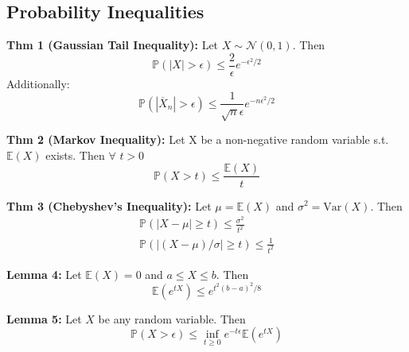 \documentclass[10pt,twocolumn]{article}
\begin{document}


\subsection*{Probability Inequalities}
\textbf{Thm 1 (Gaussian Tail Inequality):}
Let $X \sim \mathcal{N}(0,1)$. Then
\begin{equation}
    \mathbb{P}(|X| > \epsilon) \leq \frac{2}{\epsilon}e^{-\epsilon^{2}/2}
\end{equation}
Additionally:
\begin{equation}
\mathbb{P}(|\overline{X}_{n}| > \epsilon) \leq \frac{1}{\sqrt{n}\epsilon}e^{-n\epsilon^{2}/2}
\end{equation}
    
\textbf{Thm 2 (Markov Inequality):}
Let X be a non-negative random variable s.t. $\mathbb{E}(X)$ exists. Then $\forall$ $t>0$
\begin{equation}
    \mathbb{P}(X>t) \leq \frac{\mathbb{E}(X)}{t}
\end{equation}

\textbf{Thm 3 (Chebyshev's Inequality):}
Let $\mu = \mathbb{E}(X)$ and $\sigma^{2} = \text{Var}(X)$. Then
\begin{gather}
    \mathbb{P}(|X-\mu| \geq t) \leq \frac{\sigma^{2}}{t^{2}} \\
    \mathbb{P}(|(X-\mu)/\sigma| \geq t) \leq \frac{1}{t^{2}}
\end{gather}

\textbf{Lemma 4:}
Let $\mathbb{E}(X) = 0$ and $a \leq X \leq b$. Then
\begin{equation}
    \mathbb{E}(e^{tX}) \leq e^{t^{2}(b-a)^{2}/8}
\end{equation}

\textbf{Lemma 5:}
Let $X$ be any random variable. Then
\begin{equation}
    \mathbb{P}(X>\epsilon) \leq \inf_{t \geq 0} e^{-t\epsilon} \mathbb{E}(e^{tX})
\end{equation}
\end{document}
